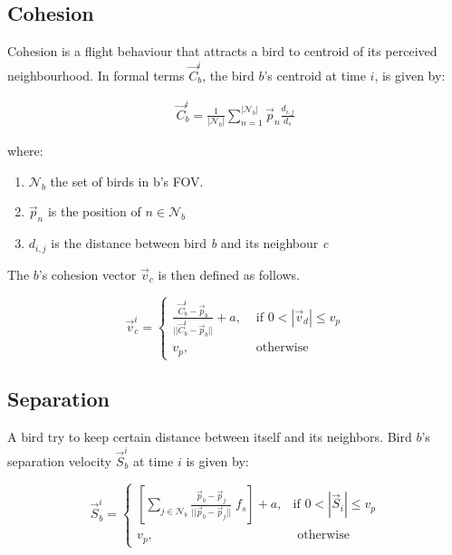 \subsection{Cohesion}
Cohesion is a flight behaviour that attracts a bird to centroid of  its perceived
neighbourhood. 
In formal terms \(\vec{C}_b^i\), the bird $b$'s centroid at time $i$, is given by:

\begin{align}
\vec{C}_b^i = \frac{1}{|\mathcal{N}_b|}\sum_{n=1}^{|\mathcal{N}_b|}{\vec{p}_n  \frac{d_{i,j}}{d_s}}
\end{align}

where:

\begin{enumerate}
	\item \(\mathcal{N}_b\) the set of birds in b's FOV.
	\item \(\vec{p}_n\) is the position of $n \in \mathcal{N}_b$
	\item \(d_{i,j}\) is the distance between bird \emph{b} and its neighbour
	\emph{c}
	
\end{enumerate}

The $b$'s cohesion vector \(\vec{v}_c\) is then defined as follows.

\begin{equation}
\vec{v}_c^i =
\begin{cases}
\frac{\vec{C}_b^i - \vec{p}_b}{|| \vec{C}_b^i - \vec{p}_b ||} +
a, &\mbox{ if } 0 < |\vec{v}_d| \leq v_p \\
v_p, &\mbox{ otherwise } 
\end{cases}
\end{equation}

\subsection{Separation}
\label{sect:separation}
A bird try to keep certain distance between itself and
its neighbors. Bird $b$'s separation velocity $\vec{S}_b^i$ at time $i$ is given
by:


\begin{equation}
\vec{S}_b^i = 
\begin{cases}
\left[\sum_{j \in \mathcal{N}_b}{\frac{\vec{p}_b -
		\vec{p}_j}{||\vec{p}_b - \vec{p}_j||}} \;f_s\right] + a ,&\mbox{if } 0 < |\vec{S}_i|
\leq v_p\\
v_p, &\mbox{ otherwise } 
\end{cases}
\end{equation}

